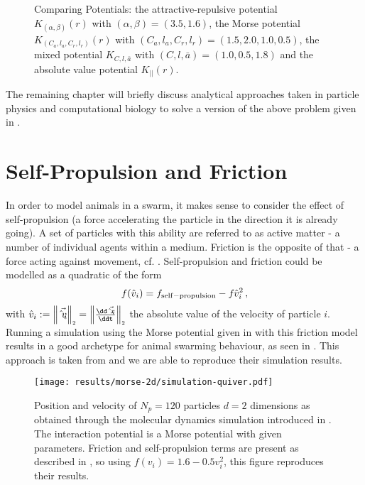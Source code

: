 \begin{figure}[H]
  \centering
  \caption[Comparing potentials]{Comparing Potentials: the attractive-repulsive potential $K_{(\alpha,\beta)}(r)$ with $(\alpha,\beta) = (3.5, 1.6)$, the Morse potential $K_{(C_a, l_a, C_r, l_r)}(r)$ with $(C_a, l_a, C_r, l_r) = (1.5, 2.0, 1.0, 0.5)$, the mixed potential $K_{C, l, \bar{a}}$ with $(C, l, \bar{a}) = (1.0, 0.5, 1.8)$ and the absolute value potential $K_{||}(r)$.}
  \label{fig:comparing-potentials}
\end{figure}

The remaining chapter will briefly discuss analytical approaches taken in particle physics and computational biology to solve a version of the above problem given in .

\section{Self-Propulsion and Friction}
\label{sec:self-propulsion-friction}
In order to model animals in a swarm, it makes sense to consider the effect of self-propulsion (a force accelerating the particle in the direction it is already going).
A set of particles with this ability are referred to as active matter - a number of individual agents within a medium.
Friction is the opposite of that - a force acting against movement, cf. .
Self-propulsion and friction could be modelled as a quadratic of the form
$$f(\hat{v}_i) = f_{\rm self-propulsion} - f_{\rm } \hat{v}_i^2\,,$$
with $\hat{v}_i := \norm{\vec{\hat{v}_i}} = \norm{\frac{\dd\vec{\hat{x}_i}}{\ddt}}$ the absolute value of the velocity of particle $i$.
Running a simulation using the Morse potential given in  with this friction model results in a good archetype for animal swarming behaviour, as seen in .
This approach is taken from \cite{2006-self-propelled} and we are able to reproduce their simulation results.


\begin{figure}[H]
  \centering
  \texttt{[image: results/morse-2d/simulation-quiver.pdf]}
  \caption[Quiver plot of 120 particles in 2D interacting through the Morse potential]{Position and velocity of $N_p = 120$ particles $d = 2$ dimensions as obtained through the molecular dynamics simulation introduced in . The interaction potential is a Morse potential with given parameters. Friction and self-propulsion terms are present as described in \cite{2006-self-propelled}, so using $f(v_i) = 1.6 - 0.5 v_i^2$, this figure reproduces their results.}
  \label{fig:simulation-quiver-illustration}
\end{figure}


